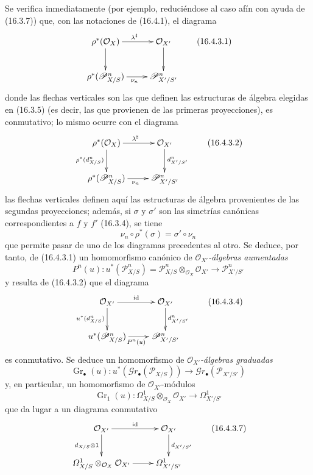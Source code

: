 \begin{env}[16.4.3]
\label{IV.16.4.3}
Se verifica inmediatamente (por ejemplo, reduciéndose al caso afín con ayuda de
(16.3.7)) que, con las notaciones de (16.4.1), el diagrama
\[
  \xymatrix{
    \rho^*(\mathcal{O}_X) \ar[r]^{\lambda^\sharp} \ar[d] &
      \mathcal{O}_{X'} \ar[d] \\
    \rho^*(\mathscr{P}_{X/S}^n) \ar[r]_{\nu_n} &
      \mathscr{P}_{X'/S'}^n
  }
  \tag{16.4.3.1}
  \label{IV.16.4.3.1}
\]
donde las flechas verticales son las que definen las estructuras de álgebra
elegidas en (16.3.5) (es decir, las que provienen de las primeras proyecciones),
es conmutativo; lo mismo ocurre con el diagrama
\[
  \xymatrix{
    \rho^*(\mathcal{O}_X) \ar[r]^{\lambda^\sharp}
      \ar[d]_{\rho^*(d_{X/S}^n)} &
      \mathcal{O}_{X'} \ar[d]^{d_{X'/S'}^n} \\
    \rho^*(\mathscr{P}_{X/S}^n) \ar[r]_{\nu_n} &
      \mathscr{P}_{X'/S'}^n
  }
  \tag{16.4.3.2}
  \label{IV.16.4.3.2}
\]
las flechas verticales definen aquí las estructuras de álgebra provenientes de las
segundas proyecciones; además, si $\sigma$ y $\sigma'$ son las simetrías
canónicas correspondientes a $f$ y $f'$ (16.3.4), se tiene
\[
  \nu_n\circ\rho^*(\sigma)=\sigma'\circ\nu_n
\]
que permite pasar de uno de los diagramas precedentes al otro. Se deduce, por tanto, de
(16.4.3.1) un homomorfismo canónico de \emph{$\mathcal{O}_{X'}$-álgebras aumentadas}
\[
  P^n(u):u^*(\mathscr{P}_{X/S}^n)
  =\mathscr{P}_{X/S}^n\otimes_{\mathcal{O}_X}\mathcal{O}_{X'}
  \longrightarrow\mathscr{P}_{X'/S'}^n
  \tag{16.4.3.3}
  \label{IV.16.4.3.3}
\]
y resulta de (16.4.3.2) que el diagrama
\[
  \xymatrix{
    \mathcal{O}_{X'} \ar[r]^{\operatorname{id}}
      \ar[d]_{u^*(d_{X/S}^n)} &
      \mathcal{O}_{X'} \ar[d]^{d_{X'/S'}^n} \\
    u^*(\mathscr{P}_{X/S}^n) \ar[r]_{P^n(u)} &
      \mathscr{P}_{X'/S'}^n
  }
  \tag{16.4.3.4}
  \label{IV.16.4.3.4}
\]
es conmutativo. Se deduce un homomorfismo de \emph{$\mathcal{O}_{X'}$-álgebras
graduadas}
\[
  \operatorname{Gr}_\bullet(u):u^*(\mathscr{G}r_\bullet(\mathscr{P}_{X/S}))
  \longrightarrow\mathscr{G}r_\bullet(\mathscr{P}_{X'/S'})
  \tag{16.4.3.5}
  \label{IV.16.4.3.5}
\]
y, en particular, un homomorfismo de $\mathcal{O}_{X'}$-módulos
\[
  \operatorname{Gr}_1(u):
  \varOmega_{X/S}^1\otimes_{\mathcal{O}_X}\mathcal{O}_{X'}
  \longrightarrow\varOmega_{X'/S'}^1
  \tag{16.4.3.6}
  \label{IV.16.4.3.6}
\]
que da lugar a un diagrama conmutativo
\[
  \xymatrix{
    \mathcal{O}_{X'} \ar[r]^{\operatorname{id}}
      \ar[d]_{d_{X/S}\otimes 1} &
      \mathcal{O}_{X'} \ar[d]^{d_{X'/S'}} \\
    \varOmega_{X/S}^1\otimes_{\mathcal{O}_X}\mathcal{O}_{X'} \ar[r] &
      \varOmega_{X'/S'}^1
  }
  \tag{16.4.3.7}
  \label{IV.16.4.3.7}
\]
\end{env}

